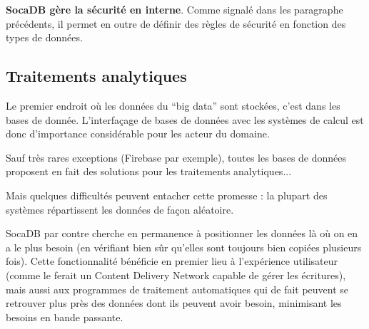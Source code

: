 \documentclass[a4paper,10pt]{scrreprt}
\begin{document}
            \textbf{SocaDB gère la sécurité en interne}. Comme signalé dans les paragraphe précédents, il permet en outre de définir des règles de sécurité en fonction des types de données.
        
        \subsection{Traitements analytiques}
        
            Le premier endroit où les données du ``big data'' sont stockées, c'est dans les bases de donnée. L'interfaçage de bases de données avec les systèmes de calcul est donc d'importance considérable pour les acteur du domaine.
        

            \medskip
            Sauf très rares exceptions (Firebase par exemple), toutes les bases de données proposent en fait des solutions pour les traitements analytiques...
            
            Mais quelques difficultés peuvent entacher cette promesse : la plupart des systèmes répartissent les données de façon aléatoire.
            
            SocaDB par contre cherche en permanence à positionner les données là où on en a le plus besoin (en vérifiant bien sûr qu'elles sont toujours bien copiées plusieurs fois). Cette fonctionnalité bénéficie en premier lieu à l'expérience utilisateur (comme le ferait un Content Delivery Network capable de gérer les écritures), mais aussi aux programmes de traitement automatiques qui de fait peuvent se retrouver plus près des données dont ils peuvent avoir besoin, minimisant les besoins en bande passante.
            
        
\end{document}
